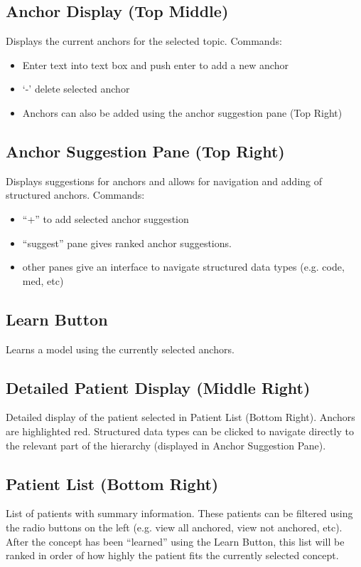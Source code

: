 \documentclass[12pt]{article}
\begin{document}
\subsection{Anchor Display (Top Middle)}
Displays the current anchors for the selected topic.
Commands:
\begin{itemize}
\item Enter text into text box and push enter to add a new anchor
\item `-' delete selected anchor
\item Anchors can also be added using the anchor suggestion pane (Top Right)
\end{itemize}

\subsection{Anchor Suggestion Pane (Top Right)}
Displays suggestions for anchors and allows for navigation and adding of structured anchors.
Commands:
\begin{itemize}
\item ``+'' to add selected anchor suggestion
\item ``suggest'' pane gives ranked anchor suggestions.
\item other panes give an interface to navigate structured data types (e.g. code, med, etc)
\end{itemize}

\subsection{Learn Button}

Learns a model using the currently selected anchors.

\subsection{Detailed Patient Display (Middle Right)}
Detailed display of the patient selected in Patient List (Bottom Right). Anchors are highlighted red. Structured data types can be clicked to navigate directly to the relevant part of the hierarchy (displayed in Anchor Suggestion Pane).

\subsection{Patient List (Bottom Right)}
List of patients with summary information. 
These patients can be filtered using the radio buttons on the left (e.g. view all anchored, view not anchored, etc).
After the concept has been ``learned'' using the Learn Button, this list will be ranked in order of how highly the patient fits the currently selected concept.
\end{document}

